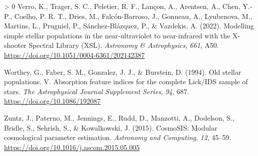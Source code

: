 \documentclass[10pt,a4paper,onecolumn]{article}
\newlength{\cslhangindent}
\newenvironment{CSLReferences}[3]%
{%
	\setlength{\parindent}{0pt}
	\ifodd #1 \everypar{\setlength{\hangindent}{\cslhangindent}}\ignorespaces\fi
	\ifnum #2 > 0
	\setlength{\parskip}{#2\baselineskip}
	\fi
}{}
\begin{document}
\begin{CSLReferences}{1}{0}
		\leavevmode\hypertarget{ref-verro+22}{}%
		Verro, K., Trager, S. C., Peletier, R. F., Lançon, A., Arentsen, A.,
		Chen, Y.-P., Coelho, P. R. T., Dries, M., Falc\'on-Barroso, J., Gonneau,
		A., Lyubenova, M., Martins, L., Prugniel, P., S\'anchez-Bl\'azquez, P., \&
		Vazdekis, A. (2022). {Modelling simple stellar populations in the
			near-ultraviolet to near-infrared with the X-shooter Spectral Library
			(XSL)}. \emph{Astronomy \& Astrophysics}, \emph{661}, A50.
		\url{https://doi.org/10.1051/0004-6361/202142387}
		
		\leavevmode\hypertarget{ref-worthey+94}{}%
		Worthey, G., Faber, S. M., Gonzalez, J. J., \& Burstein, D. (1994). Old
		stellar populations. {V}. Absorption feature indices for the complete
		{Lick/IDS} sample of stars. \emph{The Astrophysical Journal Supplement
			Series}, \emph{94}, 687. \url{https://doi.org/10.1086/192087}
		
		\leavevmode\hypertarget{ref-zuntz+15}{}%
		Zuntz, J., Paterno, M., Jennings, E., Rudd, D., Manzotti, A., Dodelson,
		S., Bridle, S., Sehrish, S., \& Kowalkowski, J. (2015). {CosmoSIS}:
		Modular cosmological parameter estimation. \emph{Astronomy and
			Computing}, \emph{12}, 45--59.
		\url{https://doi.org/10.1016/j.ascom.2015.05.005}
		
	\end{CSLReferences}
	
\end{document}
